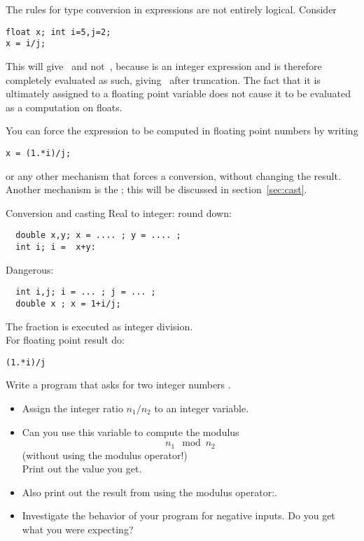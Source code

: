 The rules for type conversion in expressions are not entirely
logical. Consider
\begin{lstlisting}
float x; int i=5,j=2;
x = i/j;
\end{lstlisting}
This will give~ and not~, because  is an integer
expression and is therefore completely evaluated as such, giving~
after truncation. The fact
that it is ultimately assigned to a floating point variable does not
cause it to be evaluated as a computation on floats.

You can force the expression to be computed in floating point numbers
by writing
\begin{lstlisting}
x = (1.*i)/j;
\end{lstlisting}
or any other mechanism that forces a conversion, without changing the
result.  Another mechanism is the ; this will be
discussed in section~\ref{sec:cast}.

\begin{slide}{Conversion and casting}
  \label{sl:convert-cast}
  Real to integer: round down:
\begin{lstlisting}
  double x,y; x = .... ; y = .... ;
  int i; i =  x+y:
\end{lstlisting}
Dangerous:
\begin{lstlisting}
  int i,j; i = ... ; j = ... ; 
  double x ; x = 1+i/j;
\end{lstlisting}
The fraction is executed as integer division.\\
For floating point result do:
\begin{lstlisting}
(1.*i)/j
\end{lstlisting}
\end{slide}

\begin{exercise}
  \label{ex:modulus}
  Write a program that asks for two integer numbers .
  \begin{itemize}
  \item Assign the integer ratio $n_1/n_2$ to an integer variable.
  \item Can you use this variable to compute the modulus
    \[ n_1\mod n_2 \]
    (without using the  modulus operator!)\\
    Print out the value you get.
  \item Also print out the result from using the modulus
    operator:.
  \item Investigate the behavior of your program for negative
    inputs. Do you get what you were expecting?
  \end{itemize}
\end{exercise}

